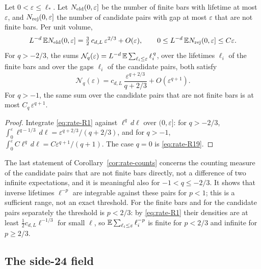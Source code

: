\begin{corollary}\label{cor:rate-counts}
Let $0<\varepsilon\le\ell_*$. Let $N_{\mathrm{eld}}(0,\varepsilon]$ be the number of finite bars with lifetime at most $\varepsilon$, and $N_{\mathrm{rej}}(0,\varepsilon]$ the number of candidate pairs with gap at most $\varepsilon$ that are not finite bars. Per unit volume,
\begin{equation}\label{eq:rate-R19}
L^{-d}\,\mathbb E N_{\mathrm{eld}}(0,\varepsilon]=\tfrac32\,c_{d,L}\,\varepsilon^{2/3}+O(\varepsilon),\qquad 0\le L^{-d}\,\mathbb E N_{\mathrm{rej}}(0,\varepsilon]\le C\varepsilon .
\end{equation}
For $q>-2/3$, the sums $\mathcal N_q(\varepsilon)=L^{-d}\,\mathbb E\sum_{\ell_i\le\varepsilon}\ell_i^{\,q}$, over the lifetimes $\ell_i$ of the finite bars and over the gaps $\ell_i$ of the candidate pairs, both satisfy
\begin{equation}\label{eq:rate-R20}
\mathcal N_q(\varepsilon)=c_{d,L}\,\frac{\varepsilon^{q+2/3}}{q+2/3}+O(\varepsilon^{q+1}).
\end{equation}
For $q>-1$, the same sum over the candidate pairs that are not finite bars is at most $C_q\,\varepsilon^{q+1}$.
\end{corollary}

\begin{proof}
Integrate \eqref{eq:rate-R1} against $\ell^q\,d\ell$ over $(0,\varepsilon]$: for $q>-2/3$, $\int_0^\varepsilon\ell^{q-1/3}\,d\ell=\varepsilon^{q+2/3}/(q+2/3)$, and for $q>-1$, $\int_0^\varepsilon C\ell^q\,d\ell=C\varepsilon^{q+1}/(q+1)$. The case $q=0$ is \eqref{eq:rate-R19}.
\end{proof}

The last statement of Corollary~\ref{cor:rate-counts} concerns the counting measure of the candidate pairs that are not finite bars directly, not a difference of two infinite expectations, and it is meaningful also for $-1<q\le-2/3$. It shows that inverse lifetimes $\ell^{-p}$ are integrable against these pairs for $p<1$; this is a sufficient range, not an exact threshold. For the finite bars and for the candidate pairs separately the threshold is $p<2/3$: by \eqref{eq:rate-R1} their densities are at least $\frac12c_{d,L}\ell^{-1/3}$ for small $\ell$, so $\mathbb E\sum_{\ell_i\le\varepsilon}\ell_i^{-p}$ is finite for $p<2/3$ and infinite for $p\ge2/3$.

\subsection*{The side-24 field}

